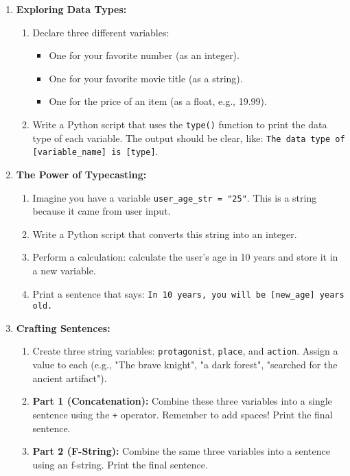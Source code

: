 \begin{enumerate}
    \item \textbf{Exploring Data Types:}
    \begin{enumerate}
        \item Declare three different variables:
        \begin{itemize}
            \item One for your favorite number (as an integer).
            \item One for your favorite movie title (as a string).
            \item One for the price of an item (as a float, e.g., 19.99).
        \end{itemize}
        \item Write a Python script that uses the \texttt{type()} function to print the data type of each variable. The output should be clear, like: \texttt{The data type of [variable_name] is [type]}.
    \end{enumerate}

    \item \textbf{The Power of Typecasting:}
    \begin{enumerate}
        \item Imagine you have a variable \texttt{user_age_str = "25"}. This is a string because it came from user input.
        \item Write a Python script that converts this string into an integer.
        \item Perform a calculation: calculate the user's age in 10 years and store it in a new variable.
        \item Print a sentence that says: \texttt{In 10 years, you will be [new_age] years old.}
    \end{enumerate}

    \item \textbf{Crafting Sentences:}
    \begin{enumerate}
        \item Create three string variables: \texttt{protagonist}, \texttt{place}, and \texttt{action}. Assign a value to each (e.g., "The brave knight", "a dark forest", "searched for the ancient artifact").
        \item \textbf{Part 1 (Concatenation):} Combine these three variables into a single sentence using the \texttt{+} operator. Remember to add spaces! Print the final sentence.
        \item \textbf{Part 2 (F-String):} Combine the same three variables into a sentence using an f-string. Print the final sentence.
    \end{enumerate}


\end{enumerate}
